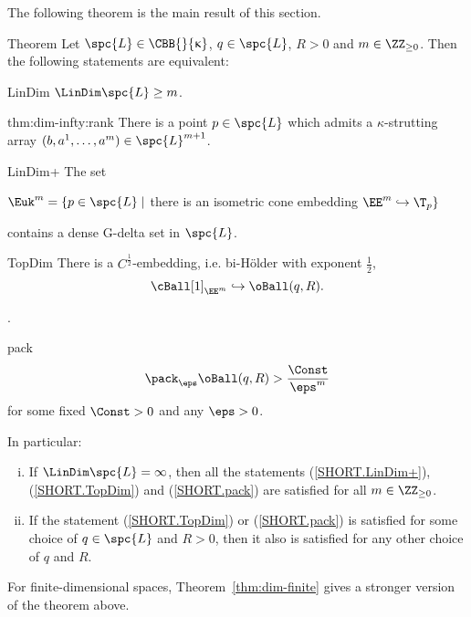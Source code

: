 The following theorem is the main result of this section.


\begin{thm}{Theorem}\label{thm:dim-infty}
Let $\spc{L}\in\CBB{}{\kappa}$, 
$q\in \spc{L}$, 
$R>0$ 
and $m\in \ZZ_{\ge0}$.
Then the following statements are equivalent:
\begin{subthmA}{LinDim}  $\LinDim\spc{L}\ge m$.
\end{subthmA}

\begin{subthmA}{thm:dim-infty:rank}
There is a point $p\in\spc{L}$ which admits a $\kappa$-strutting array $(b,a^1,\dots,a^m)\in\spc{L}^{m+1}$.
\end{subthmA}

\begin{subthmA}{LinDim+} The set 
\begin{center}
$\Euk^m=\{p\in \spc{L}\mid$ there is an isometric cone embedding $\EE^m\hookrightarrow \T_p\}$            \end{center} 
\noi contains a dense G-delta set in $\spc{L}$.
\end{subthmA}

\begin{subthmA}{TopDim} There is a $C^{\frac{1}{2}}$-embedding, i.e. bi-H\"older with exponent $\tfrac{1}{2}$,
\[\cBall[1]_{\EE^m}\hookrightarrow \oBall(q,R).\]
\end{subthmA}.

\begin{subthmA}{pack} 
\[\pack_\eps \oBall(q,R)>\frac{\Const}{\eps^m}\]
for some fixed $\Const>0$ and any $\eps>0$.
\end{subthmA}

\medskip

In particular:
\begin{enumerate}[(i)]
\item If $\LinDim\spc{L}=\infty$, then all the statements (\ref{SHORT.LinDim+}), (\ref{SHORT.TopDim}) and (\ref{SHORT.pack}) are satisfied for all $m\in\ZZ_{\ge0}$. 
\item 
 If the statement (\ref{SHORT.TopDim}) or (\ref{SHORT.pack}) is satisfied for some choice of $q\in \spc{L}$ and $R>0$, then it also is satisfied for any other choice of $q$ and $R$.
\end{enumerate}
\end{thm}

For finite-dimensional spaces, Theorem~\ref{thm:dim-finite} gives a stronger version 
of the theorem above.

